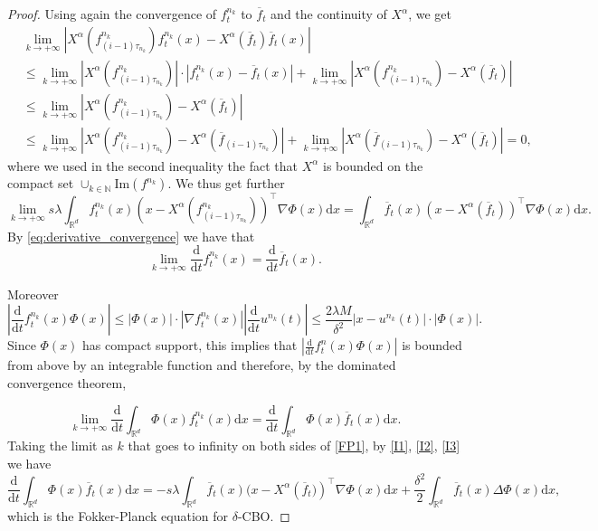 \documentclass[reqno]{amsart}
\numberwithin{algorithm}{section}
\newcommand{\diff}{\mathrm{d}}
\newcommand{\Xalpha}{{X^\alpha}}
\newcommand{\NN}{{\mathbb N}}
\begin{document}
{\begin{proof}
Using again the convergence of $f^{n_k}_t$ to $\overline{f}_t$ and the continuity of $\Xalpha$, we get
\begin{equation*}\begin{aligned}
    &\lim_{k\rightarrow+\infty}\left|\Xalpha(f^{n_k}_{(i-1)\tau_{n_k}})f^{n_k}_t(x)-\Xalpha(\overline{f}_t)\overline{f}_t(x)\right|\\
    &\leq \lim_{k\rightarrow+\infty} \left|\Xalpha(f^{n_k}_{(i-1)\tau_{n_k}})\right|\cdot|f^{n_k}_t(x)-\overline{f}_t(x)|+\lim_{k\rightarrow+\infty}\left|\Xalpha(f^{n_k}_{(i-1)\tau_{n_k}})-\Xalpha(\overline{f}_t)\right|\\
    &\leq\lim_{k\rightarrow+\infty}\left|\Xalpha(f^{n_k}_{(i-1)\tau_{n_k}})-\Xalpha(\overline{f}_t)\right|\\
    &\leq \lim_{k\rightarrow+\infty}\left|\Xalpha(f^{n_k}_{(i-1)\tau_{n_k}})-\Xalpha(\overline{f}_{(i-1)\tau_{n_k}})\right| + \lim_{k\rightarrow+\infty}\left|\Xalpha(\overline{f}_{(i-1)\tau_{n_k}}) - \Xalpha(\overline{f}_t)\right|= 0,
\end{aligned}\end{equation*}
where we used in the second inequality the fact that $\Xalpha$ is bounded on the compact set $\cup_{k \in \NN} \mathrm{Im}(f^{n_k})$.
We thus get further
\begin{equation}\label{I2}
    \lim_{k\rightarrow+\infty} s\lambda \int_{\mathbb{R}^d}f^{n_k}_t(x)\left(x-\Xalpha(f^{n_k}_{(i-1)\tau_{n_k}})\right)^\top \nabla \Phi(x) \diff x = \int_{\mathbb{R}^d}\overline{f}_t(x)(x-\Xalpha(\overline{f}_t))^\top \nabla \Phi(x) \diff x.
\end{equation}
By \cref{eq:derivative_convergence} we have that 
$$
    \lim_{k\rightarrow+\infty}\frac{\diff}{\diff t}f^{n_k}_t(x) = \frac{\diff}{\diff t}\overline{f}_t(x).
$$


Moreover 
$$\left|\frac{\diff}{\diff t} f^{n_k}_t(x)\Phi(x)\right|\leq |\Phi(x)|\cdot|\nabla f^{n_k}_t(x)|\left |\frac{\diff}{\diff t} u^{n_k}(t)\right|\leq \frac{2\lambda M}{\delta^2}|x-u^{n_k}(t)|\cdot|\Phi(x)|.$$
Since $\Phi(x)$ has compact support, this implies that $\left|\frac{\diff}{\diff t} f^n_t(x)\Phi(x)\right|$ is bounded from above by an integrable function and therefore, by the dominated convergence theorem,



\begin{equation}\label{I3}
\lim_{k\rightarrow+\infty}\frac{\diff}{\diff t}\int_{\mathbb{R}^d}\Phi(x)f^{n_k}_t(x)\diff x = \frac{\diff}{\diff t}\int_{\mathbb{R}^d}\Phi(x)\overline{f}_t(x)\diff x.
\end{equation}
Taking the limit as $k$ that goes to infinity on both sides of \eqref{FP1}, by \eqref{I1}, \eqref{I2}, \eqref{I3} we have
$$
\frac{\diff}{\diff t}\int_{\mathbb{R}^d}\Phi(x)\overline{f}_t(x)\diff x = -s\lambda \int_{\mathbb{R}^d}\overline{f}_t(x)(x-\Xalpha\left(\overline{f}_t)\right)^\top \nabla \Phi(x) \diff x + \frac{\delta^2}{2}\int_{\mathbb{R}^d}\overline{f}_t(x)\Delta\Phi(x)\diff x,$$
which is the Fokker-Planck equation for $\delta$-CBO.
\end{proof}

}
\end{document}
